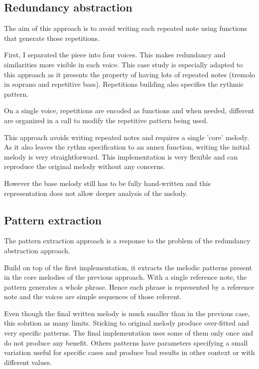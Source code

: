 \documentclass[twocolumn, 11pt]{article}
\begin{document}
\subsection{Redundancy abstraction}

The aim of this approach is to avoid writing each repeated note using functions that generate those repetitions.

First, I separated the piece into four voices. This makes redundancy and similarities more visible in each voice. This case study is especially adapted to this approach as it presents the property of having lots of repeated notes (tremolo in soprano and repetitive bass).
Repetitions building also specifies the rythmic pattern.

On a single voice, repetitions are encoded as  functions and when needed, different  are organized in a  call to modify the repetitive pattern being used.

This approach avoids writing repeated notes and requires a single 'core' melody. As it also leaves the rythm specification to an annex function, writing the initial melody is very straightforward.
This implementation is very flexible and can reproduce the original melody without any concerns.

However the base melody still has to be fully hand-written and this representation does not allow deeper analysis of the melody.

\subsection{Pattern extraction}

The pattern extraction approach is a response to the problem of the redundancy abstraction approach.

Build on top of the first implementation, it extracts the melodic patterns present in the core melodies of the previous approach. With a single reference note, the pattern generates a whole phrase. Hence each phrase is represented by a reference note and the voices are simple sequences of those referent.


Even though the final written melody is much smaller than in the previous case, this solution as many limits.
Sticking to original melody produce over-fitted and very specific patterns. The final implementation uses some of them only once and do not produce any benefit. Others patterns have parameters specifying a small variation useful for specific cases and produce bad results in other context or with different values.
\end{document}
